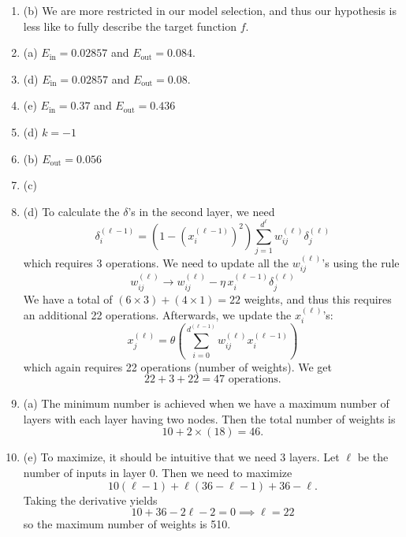 \documentclass[12pt]{article}
\begin{document}
\begin{enumerate}[leftmargin=*]
\item (b) We are more restricted in our model selection, and thus our hypothesis is less like to fully describe the target function $f$.
\item (a) $E_{\text{in}} = 0.02857$ and $E_{\text{out}} = 0.084$.
\item (d) $E_{\text{in}} = 0.02857$ and $E_{\text{out}} = 0.08$.
\item (e) $E_{\text{in}} = 0.37$ and $E_{\text{out}} = 0.436$
\item (d) $k = -1$
\item (b) $E_{\text{out}} = 0.056$
\item (c)
\item (d) To calculate the $\delta$'s in the second layer, we need
\[ \delta_i^{(\ell - 1)} = \left( 1 - (x_i^{(\ell - 1)})^2 \right) \sum_{j = 1}^{d^{\ell}} w_{i j}^{(\ell)} \delta_j^{(\ell)} \]
which requires 3 operations. We need to update all the $w_{ij}^{(\ell)}$'s using the rule
\[ w_{ij}^{(\ell)} \to w_{ij}^{(\ell)} - \eta \, x_i^{(\ell - 1)} \delta_j^{(\ell)} \]
We have a total of $(6 \times 3) + (4 \times 1) = 22$ weights, and thus this requires an additional 22 operations. Afterwards, we update the $x_i^{(\ell)}$'s:
\[ x_{j}^{(\ell)} = \theta \left( \sum_{i = 0}^{d^{(\ell - 1)}} w_{ij}^{(\ell)} x_i^{(\ell - 1)} \right) \]
which again requires 22 operations (number of weights). We get
\[ 22 + 3 + 22 = 47 \text{ operations}. \]
\item (a) The minimum number is achieved when we have a maximum number of layers with each layer having two nodes. Then the total number of weights is
\[ 10 + 2 \times (18) = 46. \]
\item (e) To maximize, it should be intuitive that we need 3 layers. Let $\ell$ be the number of inputs in layer 0. Then we need to maximize
\[ 10 (\ell - 1) + \ell (36 - \ell - 1) + 36 - \ell. \]
Taking the derivative yields
\[ 10 + 36 - 2 \ell - 2 = 0 \implies \ell =  22 \]
so the maximum number of weights is 510.
\end{enumerate}
\end{document}
